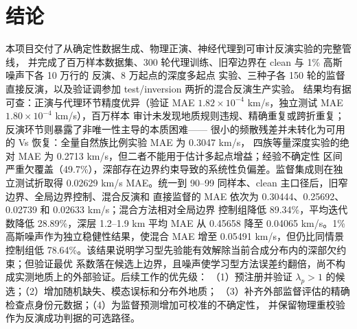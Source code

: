 \documentclass[UTF8,a4paper,11pt]{ctexart}
\begin{document}
\section{结论}\label{sec:conclusion}
本项目交付了从确定性数据生成、物理正演、神经代理到可审计反演实验的完整管线，
并完成了百万样本数据集、300 轮代理训练、旧窄边界在 clean 与 1\% 高斯噪声下各 10 万行的
反演、8 万起点的深度多起点
实验、三种子各 150 轮的监督直接反演，以及验证调参加 test/inversion 两折的混合反演生产实验。
结果均有据可查：正演与代理环节精度优异（验证 MAE
\(1.82\times10^{-4}\) km/s，独立测试 MAE \(1.80\times10^{-4}\) km/s），百万样本
审计未发现地质规则违规、精确重复或跨折重复；反演环节则暴露了非唯一性主导的本质困难——
很小的频散残差并未转化为可用的 Vs 恢复：全量自然族比例实验 MAE 为 0.3047 km/s，
四族等量深度实验的绝对 MAE 为 0.2713 km/s，但二者不能用于估计多起点增益；经验不确定性
区间严重欠覆盖（49.7\%），深部存在边界约束导致的系统性负偏差。监督集成则在独立测试折取得
0.02629 km/s MAE。统一到 90--99 同样本、clean 主口径后，旧窄边界、全局边界控制、混合反演和
直接监督的 MAE 依次为 0.30444、0.25692、0.02739 和 0.02633 km/s；混合方法相对全局边界
控制组降低 89.34\%，平均迭代数降低 28.89\%，深层 1.2--1.9 km 平均 MAE 从 0.45658 降至
0.04065 km/s。1\% 高斯噪声作为独立稳健性结果，使混合 MAE 增至 0.05491 km/s，但仍比同情景
控制组低 78.64\%。该结果说明学习型先验能有效解除当前合成分布内的深部欠约束；但验证最优
系数落在候选上边界，且噪声使学习型方法误差约翻倍，尚不构成实测地质上的外部验证。后续工作的优先级：
（1）预注册并验证 \(\lambda_p>1\) 的候选；（2）增加随机缺失、模态误标和分布外地质；
（3）补齐外部监督评估的精确检查点身份元数据；（4）为监督预测增加可校准的不确定性，
并保留物理重校验作为反演成功判据的可选路径。

\appendix
\end{document}
